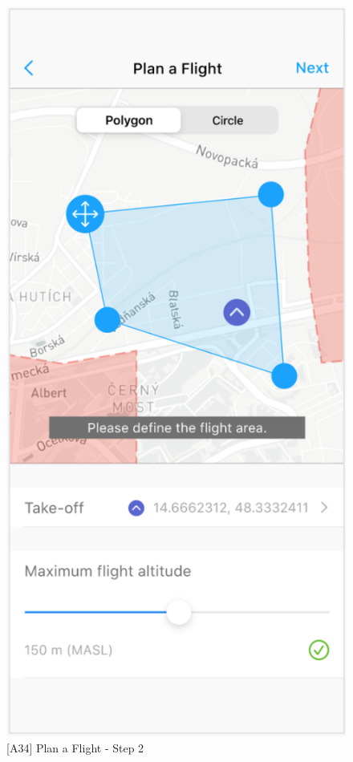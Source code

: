 \begin{figure}
\begin{minipage}{.45\textwidth}
        \includegraphics[width=.7\linewidth]{assets/user_interface_design/flight/plan_a_flight_step_2.png}
        \caption{[A34] Plan a Flight - Step 2}
        \label{fig:plan_a_flight_2}
    \end{minipage}
    \label{fig:plan_a_flight_all}
\end{figure}

